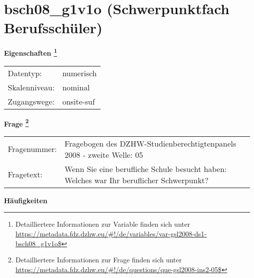 
    \setcounter{footnote}{0}

    \vspace*{-1.8cm}
	\section{bsch08\_g1v1o (Schwerpunktfach Berufsschüler)}
	\label{section:bsch08_g1v1o}



    \vspace*{0.5cm}
    \noindent\textbf{Eigenschaften
	\footnote{Detailliertere Informationen zur Variable finden sich unter
		\url{https://metadata.fdz.dzhw.eu/\#!/de/variables/var-gsl2008-ds1-bsch08_g1v1o$}}}\\
	\begin{tabularx}{\hsize}{@{}lX}
	Datentyp: & numerisch \\
	Skalenniveau: & nominal \\
	Zugangswege: &
	  onsite-suf
 \\
    \end{tabularx}



				\vspace*{0.5cm}
                \noindent\textbf{Frage
	                \footnote{Detailliertere Informationen zur Frage finden sich unter
		              \url{https://metadata.fdz.dzhw.eu/\#!/de/questions/que-gsl2008-ins2-05$}}}\\
				\begin{tabularx}{\hsize}{@{}lX}
					Fragenummer: &
					  Fragebogen des DZHW-Studienberechtigtenpanels 2008 - zweite Welle:
					  05
 \\
					Fragetext: & Wenn Sie eine berufliche Schule besucht haben: Welches war Ihr beruflicher Schwerpunkt? \\
				\end{tabularx}





        		\vspace*{0.5cm}
                \noindent\textbf{Häufigkeiten}

